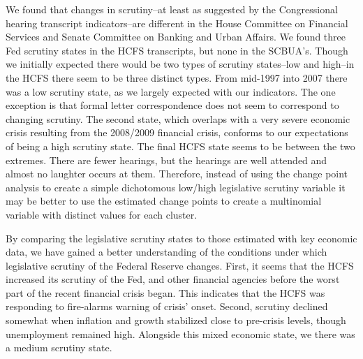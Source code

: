 \documentclass[a4paper]{article}\usepackage[]{graphicx}\usepackage[]{color}
\begin{document}
We found that changes in scrutiny--at least as suggested by the Congressional hearing transcript indicators--are different in the House Committee on Financial Services and Senate Committee on Banking and Urban Affairs. We found three Fed scrutiny states in the HCFS transcripts, but none in the SCBUA's. Though we initially expected there would be two types of scrutiny states--low and high--in the HCFS there seem to be three distinct types. From mid-1997 into 2007 there was a low scrutiny state, as we largely expected with our indicators. The one exception is that formal letter correspondence does not seem to correspond to changing scrutiny. The second state, which overlaps with a very severe economic crisis resulting from the 2008/2009 financial crisis, conforms to our expectations of being a high scrutiny state. The final HCFS state seems to be between the two extremes. There are fewer hearings, but the hearings are well attended and almost no laughter occurs at them. Therefore, instead of using the change point analysis to create a simple dichotomous low/high legislative scrutiny variable it may be better to use the estimated change points to create a multinomial variable with distinct values for each cluster.

By comparing the legislative scrutiny states to those estimated with key economic data, we have gained a better understanding of the conditions under which legislative scrutiny of the Federal Reserve changes. First, it seems that the HCFS increased its scrutiny of the Fed, and other financial agencies before the worst part of the recent financial crisis began. This indicates that the HCFS was responding to fire-alarms warning of crisis' onset. Second, scrutiny declined somewhat when inflation and growth stabilized close to pre-crisis levels, though unemployment remained high. Alongside this mixed economic state, we there was a medium scrutiny state.




\end{document}
